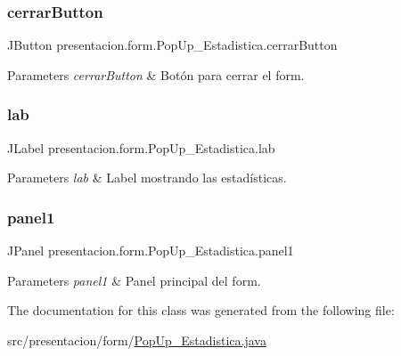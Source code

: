\subsubsection{\texorpdfstring{cerrar\+Button}{cerrarButton}}
{\footnotesize\ttfamily J\+Button presentacion.\+form.\+Pop\+Up\+\_\+\+Estadistica.\+cerrar\+Button\hspace{0.3cm}{\ttfamily [private]}}


\begin{DoxyParams}{Parameters}
{\em cerrar\+Button} & Botón para cerrar el form. \\
\hline
\end{DoxyParams}
\mbox{\label{classpresentacion_1_1form_1_1PopUp__Estadistica_ac61ead9dea9a28c411062fdc951b4df8}} 
\subsubsection{\texorpdfstring{lab}{lab}}
{\footnotesize\ttfamily J\+Label presentacion.\+form.\+Pop\+Up\+\_\+\+Estadistica.\+lab\hspace{0.3cm}{\ttfamily [private]}}


\begin{DoxyParams}{Parameters}
{\em lab} & Label mostrando las estadísticas. \\
\hline
\end{DoxyParams}
\mbox{\label{classpresentacion_1_1form_1_1PopUp__Estadistica_ac276266d42b873f89883dd3a869feadf}} 
\subsubsection{\texorpdfstring{panel1}{panel1}}
{\footnotesize\ttfamily J\+Panel presentacion.\+form.\+Pop\+Up\+\_\+\+Estadistica.\+panel1}


\begin{DoxyParams}{Parameters}
{\em panel1} & Panel principal del form. \\
\hline
\end{DoxyParams}


The documentation for this class was generated from the following file\+:\begin{DoxyCompactItemize}
\item 
src/presentacion/form/\hyperlink{PopUp__Estadistica_8java}{Pop\+Up\+\_\+\+Estadistica.\+java}\end{DoxyCompactItemize}
